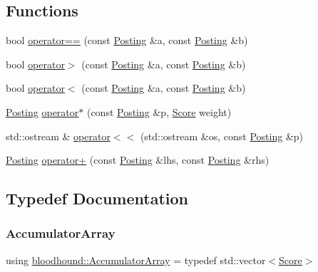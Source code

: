 \subsection*{Functions}
\begin{DoxyCompactItemize}
\item 
bool \hyperlink{namespacebloodhound_aa37ad87847e4da8983f626e6c5779c73}{operator==} (const \hyperlink{structbloodhound_1_1Posting}{Posting} \&a, const \hyperlink{structbloodhound_1_1Posting}{Posting} \&b)
\item 
bool \hyperlink{namespacebloodhound_a4a683ebe3ff767a829b87a89bade978c}{operator$>$} (const \hyperlink{structbloodhound_1_1Posting}{Posting} \&a, const \hyperlink{structbloodhound_1_1Posting}{Posting} \&b)
\item 
bool \hyperlink{namespacebloodhound_ae20cf3f97304dde56dd526eaa08c41dc}{operator$<$} (const \hyperlink{structbloodhound_1_1Posting}{Posting} \&a, const \hyperlink{structbloodhound_1_1Posting}{Posting} \&b)
\item 
\hyperlink{structbloodhound_1_1Posting}{Posting} \hyperlink{namespacebloodhound_a0ee8a7512bc2dea6326445fa8b7509b2}{operator$\ast$} (const \hyperlink{structbloodhound_1_1Posting}{Posting} \&p, \hyperlink{structbloodhound_1_1Score}{Score} weight)
\item 
std\+::ostream \& \hyperlink{namespacebloodhound_a1422cc04658f6eb8616381224186059f}{operator$<$$<$} (std\+::ostream \&os, const \hyperlink{structbloodhound_1_1Posting}{Posting} \&p)
\item 
\hyperlink{structbloodhound_1_1Posting}{Posting} \hyperlink{namespacebloodhound_a0b07d73bf298a56b219b270d5fa70b83}{operator+} (const \hyperlink{structbloodhound_1_1Posting}{Posting} \&lhs, const \hyperlink{structbloodhound_1_1Posting}{Posting} \&rhs)
\end{DoxyCompactItemize}


\subsection{Typedef Documentation}
\mbox{\label{namespacebloodhound_ae863daa54e3092bd2bc335e70f7a9dd7}} 
\subsubsection{\texorpdfstring{Accumulator\+Array}{AccumulatorArray}}
{\footnotesize\ttfamily using \hyperlink{namespacebloodhound_ae863daa54e3092bd2bc335e70f7a9dd7}{bloodhound\+::\+Accumulator\+Array} = typedef std\+::vector$<$\hyperlink{structbloodhound_1_1Score}{Score}$>$}

